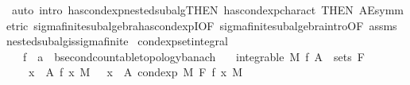 \begin{isabellebody}
\ {\isacharparenleft}{\kern0pt}auto\ intro{\isacharbang}{\kern0pt}{\isacharcolon}{\kern0pt}\ has{\isacharunderscore}{\kern0pt}cond{\isacharunderscore}{\kern0pt}exp{\isacharunderscore}{\kern0pt}nested{\isacharunderscore}{\kern0pt}subalg{\isacharbrackleft}{\kern0pt}THEN\ has{\isacharunderscore}{\kern0pt}cond{\isacharunderscore}{\kern0pt}exp{\isacharunderscore}{\kern0pt}charact{\isacharparenleft}{\kern0pt}{}{\isacharparenright}{\kern0pt}{\isacharcomma}{\kern0pt}\ THEN\ AE{\isacharunderscore}{\kern0pt}symmetric{\isacharbrackright}{\kern0pt}\ sigma{\isacharunderscore}{\kern0pt}finite{\isacharunderscore}{\kern0pt}subalgebra{\isachardot}{\kern0pt}has{\isacharunderscore}{\kern0pt}cond{\isacharunderscore}{\kern0pt}expI{\isacharbrackleft}{\kern0pt}OF\ sigma{\isacharunderscore}{\kern0pt}finite{\isacharunderscore}{\kern0pt}subalgebra{\isachardot}{\kern0pt}intro{\isacharbrackleft}{\kern0pt}OF\ assms{\isacharparenleft}{\kern0pt}{}{\isacharparenright}{\kern0pt}{\isacharbrackright}{\kern0pt}{\isacharbrackright}{\kern0pt}\ nested{\isacharunderscore}{\kern0pt}subalg{\isacharunderscore}{\kern0pt}is{\isacharunderscore}{\kern0pt}sigma{\isacharunderscore}{\kern0pt}finite{\isacharparenright}{\kern0pt}%
\endisatagproof
{\isafoldproof}%
%
\isadelimproof
\isanewline
%
\endisadelimproof
\isanewline
{}\isamarkupfalse%
\ cond{\isacharunderscore}{\kern0pt}exp{\isacharunderscore}{\kern0pt}set{\isacharunderscore}{\kern0pt}integral{\isacharcolon}{\kern0pt}\isanewline
\ \ \ f\ {\isacharcolon}{\kern0pt}{\isacharcolon}{\kern0pt}\ {\isachardoublequoteopen}{\isacharprime}{\kern0pt}a\ {\isasymRightarrow}\ {\isacharprime}{\kern0pt}b{\isacharcolon}{\kern0pt}{\isacharcolon}{\kern0pt}{\isacharbraceleft}{\kern0pt}second{\isacharunderscore}{\kern0pt}countable{\isacharunderscore}{\kern0pt}topology{\isacharcomma}{\kern0pt}banach{\isacharbraceright}{\kern0pt}{\isachardoublequoteclose}\isanewline
\ \ \ {\isachardoublequoteopen}integrable\ M\ f{\isachardoublequoteclose}\ {\isachardoublequoteopen}A\ {\isasymin}\ sets\ F{\isachardoublequoteclose}\isanewline
\ \ \ {\isachardoublequoteopen}{\isacharparenleft}{\kern0pt}{\isasymintegral}\ x\ {\isasymin}\ A{\isachardot}{\kern0pt}\ f\ x\ {\isasympartial}M{\isacharparenright}{\kern0pt}\ {\isacharequal}{\kern0pt}\ {\isacharparenleft}{\kern0pt}{\isasymintegral}\ x\ {\isasymin}\ A{\isachardot}{\kern0pt}\ cond{\isacharunderscore}{\kern0pt}exp\ M\ F\ f\ x\ {\isasympartial}M{\isacharparenright}{\kern0pt}{\isachardoublequoteclose}\isanewline
%
\isadelimproof
\ \ %
\endisadelimproof

\end{isabellebody}
